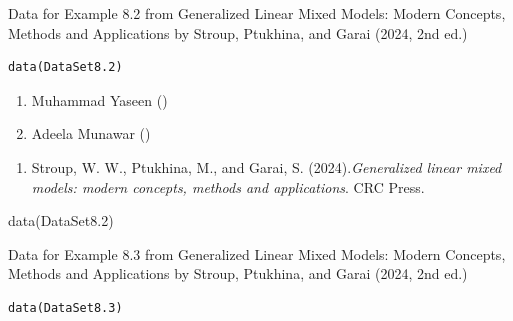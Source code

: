 \documentclass[a4paper]{book}
\begin{document}
%
\begin{Description}
Data for Example 8.2 from Generalized Linear Mixed Models: Modern Concepts, Methods and Applications by Stroup, Ptukhina, and Garai (2024, 2nd ed.)
\end{Description}
%
\begin{Usage}
\begin{verbatim}
data(DataSet8.2)
\end{verbatim}
\end{Usage}
%
\begin{Author}
\begin{enumerate}

\item{}  Muhammad Yaseen ()
\item{} Adeela Munawar ()

\end{enumerate}

\end{Author}
%
\begin{References}
\begin{enumerate}

\item{} Stroup, W. W., Ptukhina, M., and Garai, S. (2024).\emph{Generalized linear mixed models: modern concepts, methods and applications}.
CRC Press.

\end{enumerate}

\end{References}
%
\begin{SeeAlso}
\end{SeeAlso}
%
\begin{Examples}
\begin{ExampleCode}
data(DataSet8.2)
\end{ExampleCode}
\end{Examples}
%
\begin{Description}
Data for Example 8.3 from Generalized Linear Mixed Models: Modern Concepts, Methods and Applications by Stroup, Ptukhina, and Garai (2024, 2nd ed.)
\end{Description}
%
\begin{Usage}
\begin{verbatim}
data(DataSet8.3)
\end{verbatim}
\end{Usage}
\end{document}
